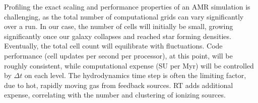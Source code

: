 \documentclass[11pt]{article}
\begin{document}

Profiling the exact scaling and performance properties of an AMR simulation is challenging, as the total number of computational grids can vary significantly over a run. In our case, the number of cells will initially be small, growing significantly once our galaxy collapses and reached star forming densities. Eventually, the total cell count will equilibrate with fluctuations. Code performance (cell updates per second per processor), at this point, will be roughly consistent, while computational expense (SU per Myr) will be controlled by $\Delta t$ on each level. The hydrodynamics time step is often the limiting factor, due to hot, rapidly moving gas from feedback sources. RT adds additional expense, correlating with the number and clustering of ionizing sources.

\end{document}
